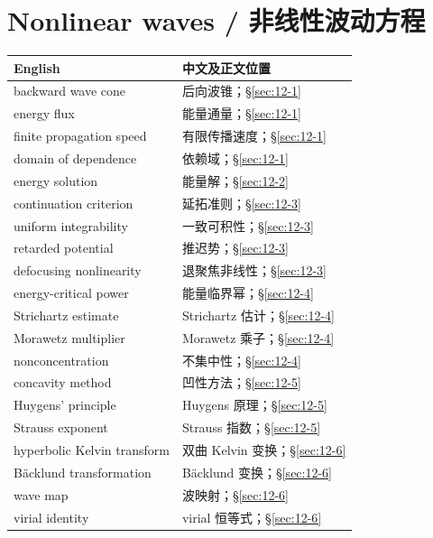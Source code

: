 \section*{Nonlinear waves / 非线性波动方程}
\begin{center}\small
\begin{tabular}{@{}p{.53\linewidth}p{.38\linewidth}@{}}
\textbf{English}&\textbf{中文及正文位置}\\\hline
backward wave cone & 后向波锥；\S\ref{sec:12-1}\\
energy flux & 能量通量；\S\ref{sec:12-1}\\
finite propagation speed & 有限传播速度；\S\ref{sec:12-1}\\
domain of dependence & 依赖域；\S\ref{sec:12-1}\\
energy solution & 能量解；\S\ref{sec:12-2}\\
continuation criterion & 延拓准则；\S\ref{sec:12-3}\\
uniform integrability & 一致可积性；\S\ref{sec:12-3}\\
retarded potential & 推迟势；\S\ref{sec:12-3}\\
defocusing nonlinearity & 退聚焦非线性；\S\ref{sec:12-3}\\
energy-critical power & 能量临界幂；\S\ref{sec:12-4}\\
Strichartz estimate & Strichartz 估计；\S\ref{sec:12-4}\\
Morawetz multiplier & Morawetz 乘子；\S\ref{sec:12-4}\\
nonconcentration & 不集中性；\S\ref{sec:12-4}\\
concavity method & 凹性方法；\S\ref{sec:12-5}\\
Huygens' principle & Huygens 原理；\S\ref{sec:12-5}\\
Strauss exponent & Strauss 指数；\S\ref{sec:12-5}\\
hyperbolic Kelvin transform & 双曲 Kelvin 变换；\S\ref{sec:12-6}\\
B\"acklund transformation & B\"acklund 变换；\S\ref{sec:12-6}\\
wave map & 波映射；\S\ref{sec:12-6}\\
virial identity & virial 恒等式；\S\ref{sec:12-6}
\end{tabular}
\end{center}
